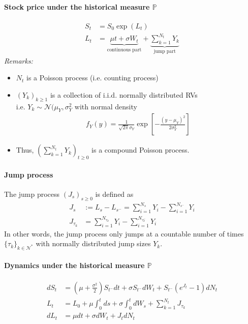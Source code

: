 \documentclass[a4paper,landscape,7pt,fleqn]{scrartcl}
\begin{document}
\begin{multicols*}{3}
\paragraph{Stock price under the historical measure $\mathbb{P}$}
\begin{align*}
S_t &= S_0 \exp (L_t) \\
L_t &= \underbrace{\mu t + \sigma W_t}\limits_\text{continuous part} + \underbrace{\sum_{k=1}^{N_t} Y_k}\limits_\text{jump part}
\end{align*}
\textit{Remarks:}
\begin{itemize}
\item $N_t$ is a Poisson process (i.e. counting process)
\item $(Y_k)_{k \geq 1}$ is a collection of i.i.d. normally distributed RVs \\
i.e. $Y_k \sim \mathcal{N}(\mu_Y,\sigma_Y^2$ with normal density
\begin{align*}
f_Y(y) = \frac{1}{\sqrt{2 \pi} \sigma_Y} \exp \left[ - \frac{(y - \mu_Y)^2}{2 \sigma_Y^2} \right]
\end{align*}
\item Thus, $\left( \sum_{k=1}^{N_t} Y_k \right)_{t \geq 0}$ is a compound Poisson process.
\end{itemize}

\paragraph{Jump process}
The jump process $(J_s)_{s \geq 0}$ is defined as
\begin{align*}
J_s &:= L_s - L_{s^-} = \sum_{i=1}^{N_s} Y_i - \sum_{i=1}^{N_{s^-}} Y_i \\
J_{\tau_k} &= \sum_{i=1}^{N_{\tau_k}} Y_i - \sum_{i=1}^{N_{\tau_k^-}} Y_i
\end{align*}
In other words, the jump process only jumps at a countable number of times $\lbrace \tau_k \rbrace_{k \in \mathcal{N}^\ast}$ with normally distributed jump sizes $Y_k$.

\paragraph{Dynamics under the historical measure $\mathbb{P}$}
\begin{align*}
dS_t &= \left( \mu + \frac{\sigma^2}{2} \right) S_{t^-} dt + \sigma S_{t^-} dW_t + S_{t^-} (e^{J_t} -1) dN_t \\
L_t &= L_0 + \mu \int_0^t ds + \sigma \int_0^t dW_s + \sum_{k=1}^{N_t} J_{\tau_k} \\
dL_t &= \mu dt + \sigma dW_t + J_t dN_t
\end{align*}


\end{multicols*}
\end{document}
